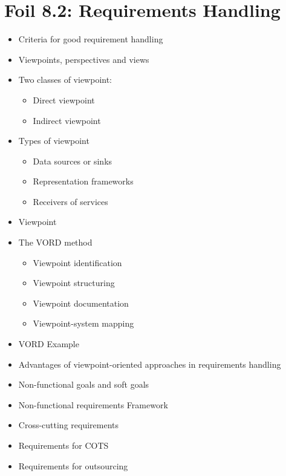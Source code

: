 	\section{Foil 8.2: Requirements Handling}
		\begin{itemize}
			\item Criteria for good requirement handling
			\item Viewpoints, perspectives and views
			\item Two classes of viewpoint:
				\begin{itemize}
					\item Direct viewpoint
					\item Indirect viewpoint
				\end{itemize}
			\item Types of viewpoint
				\begin{itemize}
					\item Data sources or sinks
					\item Representation frameworks
					\item Receivers of services
				\end{itemize}
			\item Viewpoint
			\item The VORD method
				\begin{itemize}
					\item Viewpoint identification
					\item Viewpoint structuring
					\item Viewpoint documentation
					\item Viewpoint-system mapping
				\end{itemize}
			\item VORD Example
			\item Advantages of viewpoint-oriented approaches in requirements handling
			\item Non-functional goals and soft goals
			\item Non-functional requirements Framework
			\item Cross-cutting requirements
			\item Requirements for COTS
			\item Requirements for outsourcing

		\end{itemize}



